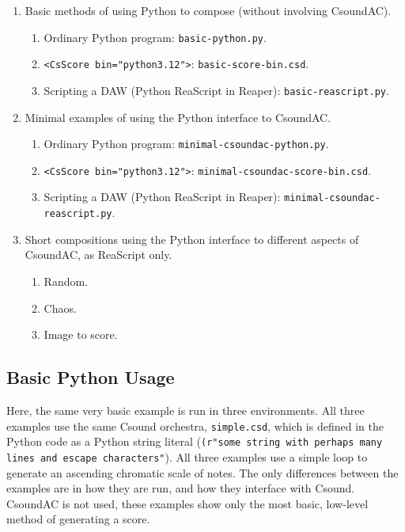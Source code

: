 \documentclass[letterpaper,10pt,DIV=12]{scrartcl}
\begin{document}
\begin{enumerate}
\item Basic methods of using Python to compose (without involving CsoundAC).
\begin{enumerate}
\item Ordinary Python program: \lstinline|basic-python.py|.
\item \lstinline|<CsScore bin="python3.12">|: \lstinline|basic-score-bin.csd|.
\item Scripting a DAW (Python ReaScript in Reaper): \lstinline|basic-reascript.py|.
\end{enumerate}
\item Minimal examples of using the Python interface to CsoundAC.
\begin{enumerate}
\item Ordinary Python program: \lstinline|minimal-csoundac-python.py|.
\item \lstinline|<CsScore bin="python3.12">|: \lstinline|minimal-csoundac-score-bin.csd|.
\item Scripting a DAW (Python ReaScript in Reaper): \lstinline|minimal-csoundac-reascript.py|.

\end{enumerate}
\item Short compositions using the Python interface to different aspects of CsoundAC, as ReaScript only.
\begin{enumerate}
\item Random.
\item Chaos.
\item Image to score.
\end{enumerate}
\end{enumerate}

\subsection{Basic Python Usage}

Here, the same very basic example is run in three environments. All three examples use the same Csound orchestra, \lstinline|simple.csd|, which is defined in the Python code as a Python string literal (\lstinline|(r"some string with perhaps many lines and escape characters"|). All three examples use a simple loop to generate an ascending chromatic scale of notes. The only differences between the examples are in how they are run, and how they interface with Csound. CsoundAC is not used, these examples show only the most basic, low-level method of generating a score.
\end{document}
